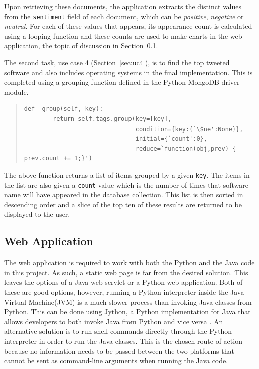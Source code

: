 Upon retrieving these documents, the application extracts the distinct values from the \texttt{sentiment} field of each document, which can be \emph{positive}, \emph{negative} or \emph{neutral}. For each of these values that appears, its appearance count is calculated using a looping function and these counts are used to make charts in the web application, the topic of discussion in Section~\ref{sec:webapp}.

The second task, use case 4 (Section~\ref{sec:uc4}), is to find the top tweeted software and also includes operating systems in the final implementation. This is completed using a grouping function defined in the Python MongoDB driver module.

\begin{quote}
\begin{lstlisting}
def _group(self, key):
        return self.tags.group(key=[key],
                               condition={key:{`\$ne':None}},
                               initial={`count':0},
                               reduce=`function(obj,prev) { prev.count += 1;}')
\end{lstlisting}
\end{quote}

The above function returns a list of items grouped by a given \texttt{key}. The items in the list are also given a \texttt{count} value which is the number of times that software name will have appeared in the database collection. This list is then sorted in descending order and a slice of the top ten of these results are returned to be displayed to the user.

\subsection{Web Application}
\label{sec:webapp}
The web application is required to work with both the Python and the Java code in this project. As such, a static web page is far from the desired solution. This leaves the options of a Java web servlet or a Python web application. Both of these are good options, however, running a Python interpreter inside the Java Virtual Machine(JVM) is a much slower process than invoking Java classes from Python. This can be done using Jython, a Python implementation for Java that allows developers to both invoke Java from Python and vice versa \cite{Juneau:2010}. An alternative solution is to run shell commands directly through the Python interpreter in order to run the Java classes. This is the chosen route of action because no information needs to be passed between the two platforms that cannot be sent as command-line arguments when running the Java code.

